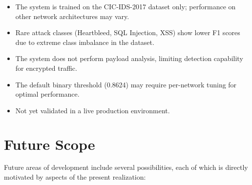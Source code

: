 \documentclass[12pt,a4paper]{report}
\begin{document}
\begin{itemize}
    \item The system is trained on the CIC-IDS-2017 dataset only; performance on other network architectures may vary.

    \item Rare attack classes (Heartbleed, SQL Injection, XSS) show lower F1 scores due to extreme class imbalance in the dataset.

    \item The system does not perform payload analysis, limiting detection capability for encrypted traffic.

    \item The default binary threshold (0.8624) may require per-network tuning for optimal performance.

    \item Not yet validated in a live production environment.
\end{itemize}

\section{Future Scope}

Future areas of development include several possibilities, each of which is directly motivated by aspects of the present realization:
\end{document}
